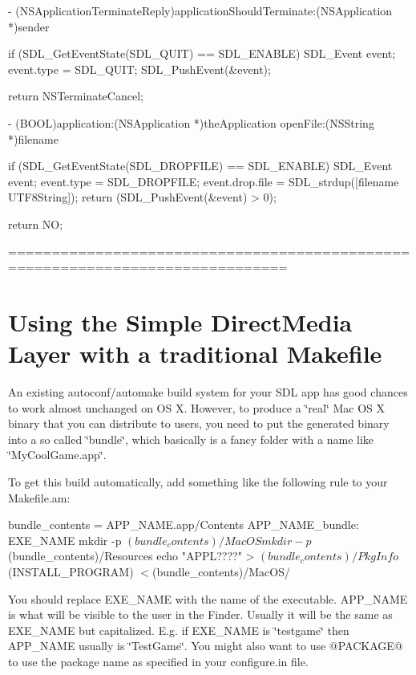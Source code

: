 \begin{DoxyVerb}- (NSApplicationTerminateReply)applicationShouldTerminate:(NSApplication *)sender
{
    if (SDL_GetEventState(SDL_QUIT) == SDL_ENABLE) {
        SDL_Event event;
        event.type = SDL_QUIT;
        SDL_PushEvent(&event);
    }

    return NSTerminateCancel;
}

- (BOOL)application:(NSApplication *)theApplication openFile:(NSString *)filename
{
    if (SDL_GetEventState(SDL_DROPFILE) == SDL_ENABLE) {
        SDL_Event event;
        event.type = SDL_DROPFILE;
        event.drop.file = SDL_strdup([filename UTF8String]);
        return (SDL_PushEvent(&event) > 0);
    }

    return NO;
}
\end{DoxyVerb}


============================================================================== \section*{Using the Simple Direct\+Media Layer with a traditional Makefile }

An existing autoconf/automake build system for your S\+DL app has good chances to work almost unchanged on OS X. However, to produce a \char`\"{}real\char`\"{} Mac OS X binary that you can distribute to users, you need to put the generated binary into a so called \char`\"{}bundle\char`\"{}, which basically is a fancy folder with a name like \char`\"{}\+My\+Cool\+Game.\+app\char`\"{}.

To get this build automatically, add something like the following rule to your Makefile.\+am\+: \begin{DoxyVerb}bundle_contents = APP_NAME.app/Contents
APP_NAME_bundle: EXE_NAME
    mkdir -p $(bundle_contents)/MacOS
    mkdir -p $(bundle_contents)/Resources
    echo "APPL????" > $(bundle_contents)/PkgInfo
    $(INSTALL_PROGRAM) $< $(bundle_contents)/MacOS/
\end{DoxyVerb}


You should replace E\+X\+E\+\_\+\+N\+A\+ME with the name of the executable. A\+P\+P\+\_\+\+N\+A\+ME is what will be visible to the user in the Finder. Usually it will be the same as E\+X\+E\+\_\+\+N\+A\+ME but capitalized. E.\+g. if E\+X\+E\+\_\+\+N\+A\+ME is \char`\"{}testgame\char`\"{} then A\+P\+P\+\_\+\+N\+A\+ME usually is \char`\"{}\+Test\+Game\char`\"{}. You might also want to use {\ttfamily @P\+A\+C\+K\+A\+GE@} to use the package name as specified in your configure.\+in file.

